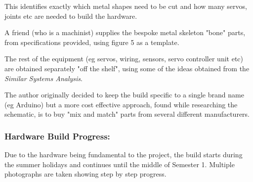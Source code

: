 \documentclass[progress]{cmpreport}
\begin{document}
This identifies exactly which metal shapes need to be cut and how many servos, joints etc are needed to build the hardware.

A friend (who is a machinist) supplies the bespoke metal skeleton "bone" parts, from specifications provided, using figure 5 as a template.
 
The rest of the equipment (eg servos, wiring, sensors, servo controller unit etc) are obtained separately "off the shelf", using some of the ideas obtained from the \textit{Similar Systems Analysis}. 

The author originally decided to keep the build specific to a single brand name (eg Arduino) but a more cost effective approach, found while researching the schematic, is to buy "mix and match" parts from several different manufacturers. 

\subsubsection{Hardware Build Progress:}

Due to the hardware being fundamental to the project, the build starts during the summer holidays and continues until the middle of Semester 1. Multiple photographs are taken showing step by step progress. 
\end{document}
